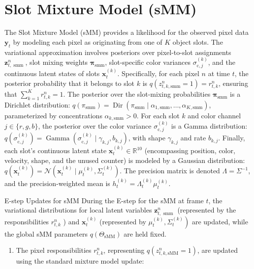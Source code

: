 \documentclass[10pt]{article}
\begin{document}
\section*{Slot Mixture Model (sMM)}
The Slot Mixture Model (sMM) provides a likelihood for the observed pixel data $\mathbf{y}_{t}$ by modeling each pixel as originating from one of $K$ object slots. The variational approximation involves posteriors over pixel-to-slot assignments $\mathbf{z}_{t, \text { smm }}^{n}$, slot mixing weights $\boldsymbol{\pi}_{\mathrm{smm}}$, slot-specific color variances $\sigma_{\mathrm{c}, j}^{(k)}$, and the continuous latent states of slots $\mathbf{x}_{t}^{(k)}$. Specifically, for each pixel $n$ at time $t$, the posterior probability that it belongs to slot $k$ is $q\left(z_{t, k, \mathrm{smm}}^{n}=1\right)=r_{t, k}^{n}$, ensuring that $\sum_{k=1}^{K} r_{t, k}^{n}=1$. The posterior over the slot-mixing probabilities $\boldsymbol{\pi}_{\mathrm{smm}}$ is a Dirichlet distribution: $q\left(\pi_{\mathrm{smm}}\right)=\operatorname{Dir}\left(\pi_{\mathrm{smm}} \mid \alpha_{1, \mathrm{smm}}, \ldots, \alpha_{K, \mathrm{smm}}\right)$, parameterized by concentrations $\alpha_{k, \mathrm{smm}}>0$. For each slot $k$ and color channel $j \in\{r, g, b\}$, the posterior over the color variance $\sigma_{\mathrm{c}, j}^{(k)}$ is a Gamma distribution: $q\left(\sigma_{\mathrm{c}, j}^{(k)}\right)=\operatorname{Gamma}\left(\sigma_{\mathrm{c}, j}^{(k)} \mid \gamma_{k, j}, b_{k, j}\right)$, with shape $\gamma_{k, j}$ and rate $b_{k, j}$. Finally, each slot's continuous latent state $\mathbf{x}_{t}^{(k)} \in \mathbb{R}^{10}$ (encompassing position, color, velocity, shape, and the unused counter) is modeled by a Gaussian distribution: $q\left(\mathbf{x}_{t}^{(k)}\right)=\mathcal{N}\left(\mathbf{x}_{t}^{(k)} \mid \mu_{t}^{(k)}, \Sigma_{t}^{(k)}\right)$. The precision matrix is denoted $\Lambda=\Sigma^{-1}$, and the precision-weighted mean is $h_{t}^{(k)}=\Lambda_{t}^{(k)} \mu_{t}^{(k)}$.

E-step Updates for sMM During the E-step for the sMM at frame $t$, the variational distributions for local latent variables $\mathbf{z}_{t, \text { smm }}^{n}$ (represented by the responsibilities $r_{t, k}^{n}$ ) and $\mathbf{x}_{t}^{(k)}$ (represented by $\left.\mu_{t}^{(k)}, \Sigma_{t}^{(k)}\right)$ are updated, while the global sMM parameters $q\left(\Theta_{\mathrm{sMM}}\right)$ are held fixed.

\begin{enumerate}
  \item The pixel responsibilities $r_{t, k}^{n}$, representing $q\left(z_{t, k, \mathrm{sMM}}^{n}=1\right)$, are updated using the standard mixture model update:
\end{enumerate}
\end{document}
